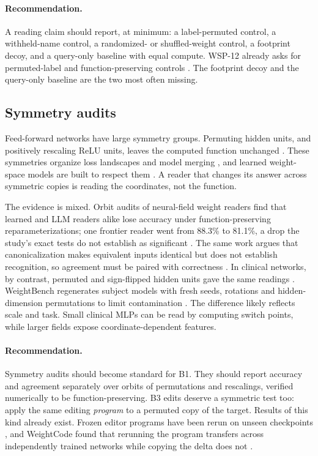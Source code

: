 \paragraph{Recommendation.} A reading claim should report, at minimum: a label-permuted control, a withheld-name control, a randomized- or shuffled-weight control, a footprint decoy, and a query-only baseline with equal compute. WSP-12 already asks for permuted-label and function-preserving controls \citep{turkoglu2026survey}. The footprint decoy and the query-only baseline are the two most often missing.

\subsection{Symmetry audits}
\label{sec:symmetry}

Feed-forward networks have large symmetry groups. Permuting hidden units, and positively rescaling ReLU units, leaves the computed function unchanged \citep{hechtnielsen1990algebraic}. These symmetries organize loss landscapes and model merging \citep{ax2110_06296,ax2209_04836}, and learned weight-space models are built to respect them \citep{ax2301_12780,ax2302_14040}. A reader that changes its answer across symmetric copies is reading the coordinates, not the function.

The evidence is mixed. Orbit audits of neural-field weight readers find that learned and LLM readers alike lose accuracy under function-preserving reparameterizations; one frontier reader went from 88.3\% to 81.1\%, a drop the study's exact tests do not establish as significant \citep{ax2611_05798}. The same work argues that canonicalization makes equivalent inputs identical but does not establish recognition, so agreement must be paired with correctness \citep{ax2611_05798}. In clinical networks, by contrast, permuted and sign-flipped hidden units gave the same readings \citep{ax2611_07847}. WeightBench regenerates subject models with fresh seeds, rotations and hidden-dimension permutations to limit contamination \citep{ax2611_18553}. The difference likely reflects scale and task. Small clinical MLPs can be read by computing switch points, while larger fields expose coordinate-dependent features.

\paragraph{Recommendation.} Symmetry audits should become standard for B1. They should report accuracy and agreement separately over orbits of permutations and rescalings, verified numerically to be function-preserving. B3 edits deserve a symmetric test too: apply the same editing \emph{program} to a permuted copy of the target. Results of this kind already exist. Frozen editor programs have been rerun on unseen checkpoints \citep{ax2611_23615,ax2611_28105}, and WeightCode found that rerunning the program transfers across independently trained networks while copying the delta does not \citep{ax2611_25476}.

